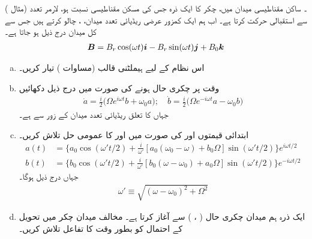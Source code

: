 ۔ ساکن مقناطیسی میدان  میں،   چکر کا ایک ذرہ جس کی مسکن مقناطیسی نسبت  ہو،  لارمر تعدد  (مثال ) سے استقبالی حرکت کرتا ہے۔ اب ہم ایک کمزور عرضی ریڈیائی تعدد میدان،  ،  چالو کرتے ہیں جس سے کل میدان درج ذیل ہو جاتا ہے۔
\begin{align}
	{\ensuremath{{\boldsymbol{B}}}} = B_{r}\cos(\omega t){\boldsymbol{i}} - B_{r}\sin(\omega t){\boldsymbol{j}} + B_0{\boldsymbol{k}}
\end{align} 
\begin{enumerate}[a.]
\item
اس نظام کے لیے  ہیملٹنی قالب  (مساوات )   تیار کریں۔
\item
 وقت  پر چکری حال   ہونے کی صورت میں درج ذیل دکھائیں
\begin{align}
	\dot{a} = \frac{i}{2}\big(\Omega e^{i\omega t}b+\omega_0 a\big); \quad\dot{b} = \frac{i}{2}\big(\Omega e^{-i\omega t}a-\omega_0 b\big)
\end{align}
جہاں  کا تعلق ریڈیائی تعدد میدان کے  زور سے  ہے۔
\item
 ابتدائی قیمتوں   اور  کی صورت میں  اور  کا عمومی حل تلاش کریں۔   
\begin{align*}
	a(t) &= \bigg\{a_0\cos(\omega't/2)+\frac{i}{\omega'}[a_0(\omega_0-\omega)+b_0\Omega]\sin(\omega't/2)\bigg\}e^{i\omega t/2} \\
	b(t) &= \bigg\{b_0\cos(\omega't/2)+\frac{i}{\omega'}[b_0(\omega-\omega_0)+a_0\Omega]\sin(\omega't/2)\bigg\}e^{-i\omega t/2}   
\end{align*}
جہاں درج ذیل ہوگا۔
\begin{align}
	\omega'\equiv\sqrt{(\omega-\omega_0)^2+\Omega^2}
\end{align}
\item
 ایک ذرہ ہم  میدان چکری حال ( ،  ) سے  آغاز کرتا ہے۔ مخالف میدان چکر میں تحویل کے احتمال کو بطور وقت کا تفاعل تلاش کریں۔


\end{enumerate}
